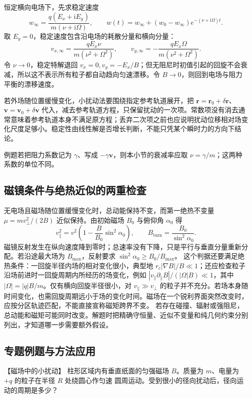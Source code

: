 {恒定横向电场下，先求稳定速度
\[
 w_\infty=\frac{q(E_x+\mathrm iE_y)}{m(\nu+\mathrm i\Omega)},\qquad
 w(t)=w_\infty+(w_0-w_\infty)e^{-(\nu+\mathrm i\Omega)t}.
\]
取 $E_y=0$，稳定速度包含沿电场的耗散分量和横向分量：
\[
 v_{x,\infty}=\frac{qE_x\nu}{m(\nu^2+\Omega^2)},\qquad
 v_{y,\infty}=-\frac{qE_x\Omega}{m(\nu^2+\Omega^2)}.
\]
令 $\nu\to0$，稳定特解退回 $v_x=0,v_y=-E_x/B$；但无阻尼时初值引起的回旋不会衰减，所以这不表示所有粒子都自动趋向匀速漂移。令 $B\to0$，则回到电场与阻力平衡的漂移速度。

若外场随位置缓慢变化，小扰动法要围绕指定参考轨道展开，把 $\boldsymbol r=\boldsymbol r_0+\delta\boldsymbol r$、$\boldsymbol v=\boldsymbol v_0+\delta\boldsymbol v$ 代入，减去参考轨道方程，只保留扰动的一次项。常数项没有消去通常意味着参考轨道本身不满足原方程；丢弃二次项之前也应说明扰动位移相对场变化尺度足够小。稳定性由线性解是否增长判断，不能只凭某个瞬时力的方向下结论。

例题若把阻力系数记为 $\gamma$、写成 $-\gamma\boldsymbol v$，则本小节的衰减率应取 $\nu=\gamma/m$；这两种系数的单位不同。

\subsection{磁镜条件与绝热近似的两重检查}
无电场且磁场随位置缓慢变化时，总动能保持不变，而第一绝热不变量
$\mu=m v_\perp^2/(2B)$ 近似保持。由初始磁场 $B_0$ 与俯仰角 $\alpha_0$ 得
\[
 v_\parallel^2=v^2\left(1-\frac{B}{B_0}\sin^2\alpha_0\right),\qquad
 B_{\mathrm{turn}}=\frac{B_0}{\sin^2\alpha_0}.
\]
磁镜反射发生在纵向速度降到零时；总速率没有下降，只是平行与垂直分量重新分配。若沿途最大场为 $B_{\max}$，反射要求 $\sin^2\alpha_0\ge B_0/B_{\max}$。
这个判据还要满足绝热条件：一回旋半径内场的相对变化很小，典型地 $r_c|\nabla B|/B\ll1$；还应检查粒子沿场前进时一回旋周期内所经历的场变化，例如 $|v_\parallel\partial_\parallel B|/(|\Omega|B)\ll1$，其中 $|\Omega|=|q|B/m$。仅有横向回旋半径很小，对 $v_\parallel\gg v_\perp$ 的粒子并不充分。若场本身随时间变化，也需回旋周期远小于场的变化时间。磁场在一个锐利界面突然改变时，应按分区轨迹匹配，不能直接宣称磁矩跨界不变。
若存在碰撞、辐射或强阻尼，总动能和磁矩可能同时改变。解题时把精确守恒量、近似不变量和纯几何约束分别列出，才知道哪一步需要额外假设。


\subsection{专题例题与方法应用}

\begin{origexamplebox}{【磁场中的小扰动】}\label{ch22:ex:s38-7-13}
柱形区域内有垂直纸面的匀强磁场 $B$。质量为 $m$、电量为 $+q$ 的粒子在半径 $R$ 处绕圆心作匀速
圆周运动。受到很小的径向扰动后，径向运动的周期是多少？


\end{origexamplebox}}
